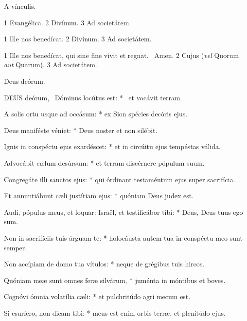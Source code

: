 
 A vínculis.


 1 Evangélica. 2 Divínum. 3 Ad societátem.


 1 Ille nos benedícat. 2 Divínum. 3 Ad societátem.


 1 Ille nos benedícat, qui sine fine vivit et regnat. \R\ Amen. 2 Cujus (\textit{vel} Quorum \textit{aut} Quarum). 3 Ad societátem.




 Deus deórum. \textdagger


\lettrine[lines=2]{D}{EUS} deórum, \textdagger\ Dóminus locútus est: * \textdaggerdbl\ et vocávit terram.

A solis ortu usque ad occásum: * ex Sion spécies decóris ejus.

Deus maniféste véniet: * Deus noster et non silébit.

Ignis in conspéctu ejus exardéscet: * et in circúitu ejus tempéstas válida.

Advocábit cælum desúrsum: * et terram discérnere pópulum suum.

Congregáte illi sanctos ejus: * qui órdinant testaméntum ejus super sacrifícia.

Et annuntiábunt cæli justítiam ejus: * quóniam Deus judex est.

Audi, pópulus meus, et loquar: Israël, et testificábor tibi: * Deus, Deus tuus ego sum.

Non in sacrifíciis tuis árguam te: * holocáusta autem tua in conspéctu meo sunt semper.

Non accípiam de domo tua vítulos: * neque de grégibus tuis hircos.

Quóniam meæ sunt omnes feræ silvárum, * juménta in móntibus et boves.

Cognóvi ómnia volatília cæli: * et pulchritúdo agri mecum est.

Si esuríero, non dicam tibi: * meus est enim orbis terræ, et plenitúdo ejus.


